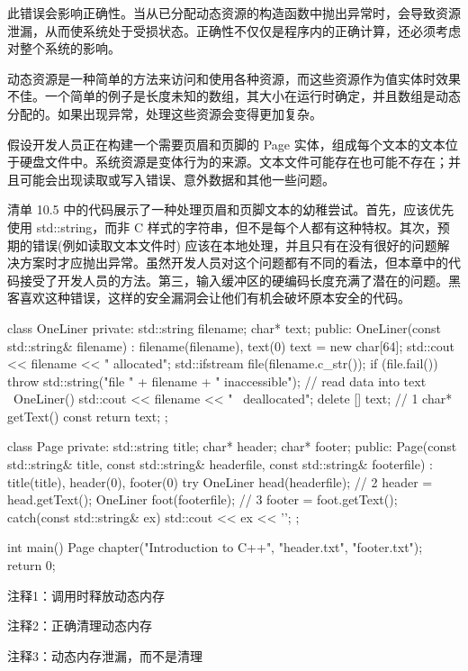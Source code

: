 此错误会影响正确性。当从已分配动态资源的构造函数中抛出异常时，会导致资源泄漏，从而使系统处于受损状态。正确性不仅仅是程序内的正确计算，还必须考虑对整个系统的影响。

动态资源是一种简单的方法来访问和使用各种资源，而这些资源作为值实体时效果不佳。一个简单的例子是长度未知的数组，其大小在运行时确定，并且数组是动态分配的。如果出现异常，处理这些资源会变得更加复杂。


假设开发人员正在构建一个需要页眉和页脚的 Page 实体，组成每个文本的文本位于硬盘文件中。系统资源是变体行为的来源。文本文件可能存在也可能不存在；并且可能会出现读取或写入错误、意外数据和其他一些问题。

清单 10.5 中的代码展示了一种处理页眉和页脚文本的幼稚尝试。首先，应该优先使用 std::string，而非 C 样式的字符串，但不是每个人都有这种特权。其次，预期的错误(例如读取文本文件时) 应该在本地处理，并且只有在没有很好的问题解决方案时才应抛出异常。虽然开发人员对这个问题都有不同的看法，但本章中的代码接受了开发人员的方法。第三，输入缓冲区的硬编码长度充满了潜在的问题。黑客喜欢这种错误，这样的安全漏洞会让他们有机会破坏原本安全的代码。


\begin{cpp}
class OneLiner {
private:
  std::string filename;
  char* text;
public:
  OneLiner(const std::string& filename) : filename(filename), text(0) {
    text = new char[64];
    std::cout << filename << " allocated\n";
    std::ifstream file(filename.c_str());
    if (file.fail())
      throw std::string("file " + filename + " inaccessible");
    // read data into text
  }
  ~OneLiner() { std::cout << filename <<
    " ~deallocated\n"; delete [] text; } // 1
    char* getText() const { return text; }
};

class Page {
private:
  std::string title;
  char* header;
  char* footer;
public:
  Page(const std::string& title, const std::string& headerfile, const
  std::string& footerfile) :
  title(title), header(0), footer(0) {
    try {
      OneLiner head(headerfile); // 2
      header = head.getText();
      OneLiner foot(footerfile); // 3
      footer = foot.getText();
    } catch(const std::string& ex) {
      std::cout << ex << '\n';
    }
  }
};

int main() {
  Page chapter("Introduction to C++", "header.txt", "footer.txt");
  return 0;
}
\end{cpp}

{\footnotesize
注释1：调用时释放动态内存

注释2：正确清理动态内存

注释3：动态内存泄漏，而不是清理
}

